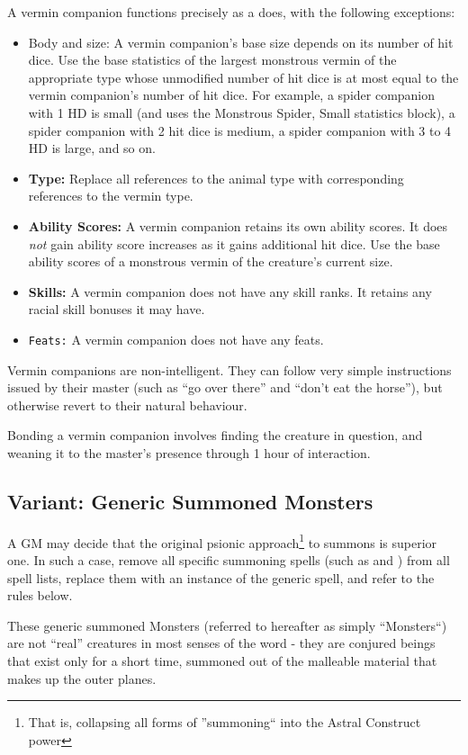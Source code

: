 A vermin companion functions precisely as a  does, with the following exceptions:
\begin{itemize}
 \item Body and size: A vermin companion's base size depends on its number of hit dice. Use the base statistics of the largest monstrous vermin of the appropriate type whose unmodified number of hit dice is at most equal to the vermin companion's number of hit dice. For example, a spider companion with 1 HD is small (and uses the Monstrous Spider, Small statistics block), a spider companion with 2 hit dice is medium, a spider companion with 3 to 4 HD is large, and so on.
 \item \textbf{Type:} Replace all references to the animal type with corresponding references to the vermin type.
 \item \textbf{Ability Scores:} A vermin companion retains its own ability scores.
 It does \emph{not} gain ability score increases as it gains additional hit dice. Use the base ability scores of a monstrous vermin of the creature's current size.
 \item \textbf{Skills:} A vermin companion does not have any skill ranks. It retains any racial skill bonuses it may have. 
 \item \texttt{Feats:} A vermin companion does not have any feats.
\end{itemize}
Vermin companions are non-intelligent. They can follow very simple instructions issued by their master (such as ``go over there'' and ``don't eat the horse''), but otherwise revert to their natural behaviour.

Bonding a vermin companion involves finding the creature in question, and weaning it to the master's presence through 1 hour of interaction.

\subsection{Variant: Generic Summoned Monsters}
\label{sec:SummonedMonsters}
A GM may decide that the original psionic approach\footnote{That is, collapsing all forms of ''summoning`` into the Astral Construct power} to summons is superior one. In such a case, remove all specific summoning spells (such as  and ) from all spell lists, replace them with an instance of the generic  spell, and refer to the rules below.

These generic summoned Monsters (referred to hereafter as simply ``Monsters``) are not ``real'' creatures
in most senses of the word - they are conjured beings that exist only for a short time, summoned out
of the malleable material that makes up the outer planes.

